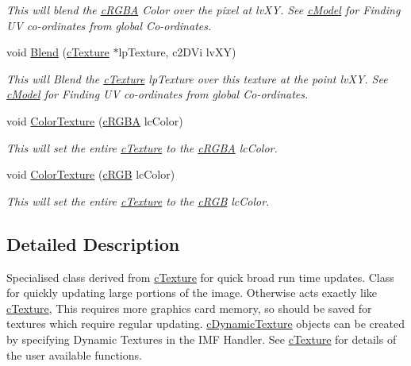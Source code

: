 \begin{DoxyCompactItemize}
\begin{DoxyCompactList}\small\item\em This will blend the \hyperlink{classc_r_g_b_a}{cRGBA} Color over the pixel at lvXY. See \hyperlink{classc_model}{cModel} for Finding UV co-\/ordinates from global Co-\/ordinates. \end{DoxyCompactList}\item 
\hypertarget{classc_dynamic_texture_a7f247ca09bc5b1bafe1b33d8dafce7af}{
void \hyperlink{classc_dynamic_texture_a7f247ca09bc5b1bafe1b33d8dafce7af}{Blend} (\hyperlink{classc_texture}{cTexture} $\ast$lpTexture, c2DVi lvXY)}
\label{classc_dynamic_texture_a7f247ca09bc5b1bafe1b33d8dafce7af}

\begin{DoxyCompactList}\small\item\em This will Blend the \hyperlink{classc_texture}{cTexture} lpTexture over this texture at the point lvXY. See \hyperlink{classc_model}{cModel} for Finding UV co-\/ordinates from global Co-\/ordinates. \end{DoxyCompactList}\item 
\hypertarget{classc_dynamic_texture_a53699d1535ff7d32514e2e763c3d6032}{
void \hyperlink{classc_dynamic_texture_a53699d1535ff7d32514e2e763c3d6032}{ColorTexture} (\hyperlink{classc_r_g_b_a}{cRGBA} lcColor)}
\label{classc_dynamic_texture_a53699d1535ff7d32514e2e763c3d6032}

\begin{DoxyCompactList}\small\item\em This will set the entire \hyperlink{classc_texture}{cTexture} to the \hyperlink{classc_r_g_b_a}{cRGBA} lcColor. \end{DoxyCompactList}\item 
\hypertarget{classc_dynamic_texture_a88de652fe044c258a45b78bab57d1250}{
void \hyperlink{classc_dynamic_texture_a88de652fe044c258a45b78bab57d1250}{ColorTexture} (\hyperlink{classc_r_g_b}{cRGB} lcColor)}
\label{classc_dynamic_texture_a88de652fe044c258a45b78bab57d1250}

\begin{DoxyCompactList}\small\item\em This will set the entire \hyperlink{classc_texture}{cTexture} to the \hyperlink{classc_r_g_b}{cRGB} lcColor. \end{DoxyCompactList}\end{DoxyCompactItemize}


\subsection{Detailed Description}
Specialised class derived from \hyperlink{classc_texture}{cTexture} for quick broad run time updates. Class for quickly updating large portions of the image. Otherwise acts exactly like \hyperlink{classc_texture}{cTexture}, This requires more graphics card memory, so should be saved for textures which require regular updating. \hyperlink{classc_dynamic_texture}{cDynamicTexture} objects can be created by specifying Dynamic Textures in the IMF Handler. See \hyperlink{classc_texture}{cTexture} for details of the user available functions. 